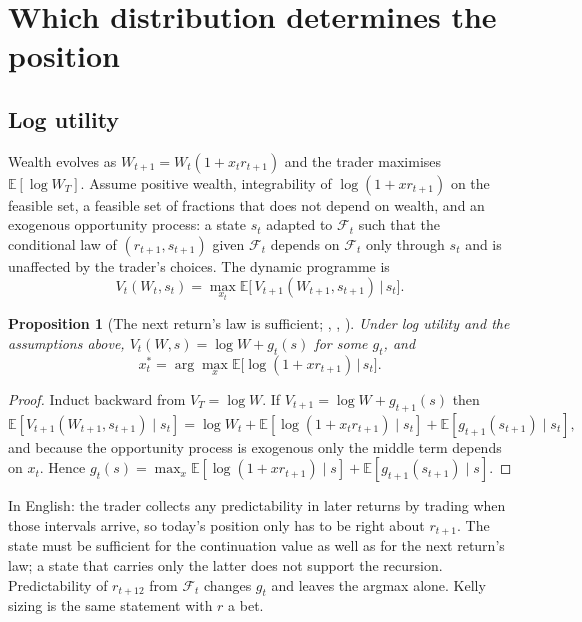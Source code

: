 \documentclass[11pt]{article}
\newtheorem{proposition}{Proposition}
\newcommand{\E}{\mathbb{E}}
\newcommand{\F}{\mathcal{F}}
\begin{document}
\section{Which distribution determines the position}

\subsection{Log utility}

Wealth evolves as $W_{t+1} = W_t(1 + x_t r_{t+1})$ and the trader maximises $\E[\log W_T]$. Assume positive wealth, integrability of $\log(1 + x r_{t+1})$ on the feasible set, a feasible set of fractions that does not depend on wealth, and an exogenous opportunity process: a state $s_t$ adapted to $\F_t$ such that the conditional law of $(r_{t+1}, s_{t+1})$ given $\F_t$ depends on $\F_t$ only through $s_t$ and is unaffected by the trader's choices. The dynamic programme is
\begin{equation}
V_t(W_t, s_t) = \max_{x_t} \E\big[\,V_{t+1}(W_{t+1}, s_{t+1}) \,\big|\, s_t\big].
\label{eq:dp}
\end{equation}

\begin{proposition}[The next return's law is sufficient; \citealt{mossin1968}, \citealt{samuelson1969}, \citealt{merton1969}]
Under log utility and the assumptions above, $V_t(W, s) = \log W + g_t(s)$ for some $g_t$, and
\[
x_t^\ast = \arg\max_x \E\big[\log(1 + x r_{t+1}) \,\big|\, s_t\big].
\]
\end{proposition}
\begin{proof}
Induct backward from $V_T = \log W$. If $V_{t+1} = \log W + g_{t+1}(s)$ then
\[
\E[V_{t+1}(W_{t+1}, s_{t+1}) \mid s_t] = \log W_t + \E[\log(1 + x_t r_{t+1}) \mid s_t] + \E[g_{t+1}(s_{t+1}) \mid s_t],
\]
and because the opportunity process is exogenous only the middle term depends on $x_t$. Hence $g_t(s) = \max_x \E[\log(1 + x r_{t+1}) \mid s] + \E[g_{t+1}(s_{t+1}) \mid s]$.
\end{proof}

In English: the trader collects any predictability in later returns by trading when those intervals arrive, so today's position only has to be right about $r_{t+1}$. The state must be sufficient for the continuation value as well as for the next return's law; a state that carries only the latter does not support the recursion. Predictability of $r_{t+12}$ from $\F_t$ changes $g_t$ and leaves the argmax alone. Kelly sizing \citep{kelly1956} is the same statement with $r$ a bet.
\end{document}

